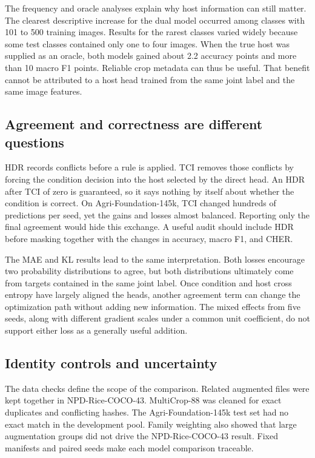 \documentclass[preprint,12pt]{elsarticle}
\begin{document}
The frequency and oracle analyses explain why host information can still
matter. The clearest descriptive increase for the dual model occurred among
classes with 101 to 500 training images. Results for the rarest classes varied
widely because some test classes contained only one to four images. When the
true host was supplied as an oracle, both models gained about 2.2 accuracy
points and more than 10 macro F1 points. Reliable crop metadata can thus be
useful. That benefit cannot be attributed to a host head trained from the same
joint label and the same image features.

\subsection{Agreement and correctness are different questions}

HDR records conflicts before a rule is applied. TCI removes those conflicts by
forcing the condition decision into the host selected by the direct head. An
HDR after TCI of zero is guaranteed, so it says nothing by itself about whether
the condition is correct. On Agri-Foundation-145k, TCI changed hundreds of
predictions per seed, yet the gains and losses almost balanced. Reporting only
the final agreement would hide this exchange. A useful audit should include HDR
before masking together with the changes in accuracy, macro F1, and CHER.

The MAE and KL results lead to the same interpretation. Both losses encourage
two probability distributions to agree, but both distributions ultimately come
from targets contained in the same joint label. Once condition and host cross
entropy have largely aligned the heads, another agreement term can change the
optimization path without adding new information. The mixed effects from five
seeds, along with different gradient scales under a common unit coefficient, do
not support either loss as a generally useful addition.

\subsection{Identity controls and uncertainty}

The data checks define the scope of the comparison. Related augmented files
were kept together in NPD-Rice-COCO-43. MultiCrop-88 was cleaned for exact
duplicates and conflicting hashes. The Agri-Foundation-145k test set had no
exact match in the development pool. Family weighting also showed that large
augmentation groups did not drive the NPD-Rice-COCO-43 result. Fixed manifests
and paired seeds make each model comparison traceable.
\end{document}
